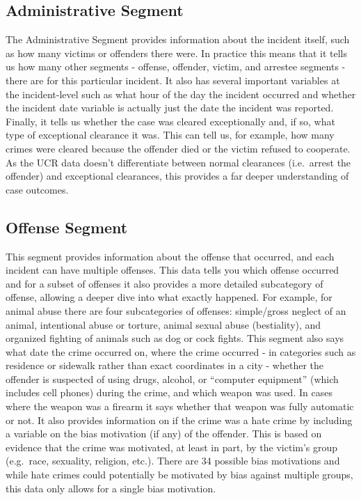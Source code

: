 \documentclass[
]{krantz}
\begin{document}
\subsection{Administrative
Segment}\label{administrative-segment}

The Administrative Segment provides information about the
incident itself, such as how many victims or offenders there
were. In practice this means that it tells us how many other
segments - offense, offender, victim, and arrestee segments
- there are for this particular incident. It also has
several important variables at the incident-level such as
what hour of the day the incident occurred and whether the
incident date variable is actually just the date the
incident was reported. Finally, it tells us whether the case
was cleared exceptionally and, if so, what type of
exceptional clearance it was. This can tell us, for example,
how many crimes were cleared because the offender died or
the victim refused to cooperate. As the UCR data doesn't
differentiate between normal clearances (i.e.~arrest the
offender) and exceptional clearances, this provides a far
deeper understanding of case outcomes.

\subsection{Offense Segment}\label{offense-segment}

This segment provides information about the offense that
occurred, and each incident can have multiple offenses. This
data tells you which offense occurred and for a subset of
offenses it also provides a more detailed subcategory of
offense, allowing a deeper dive into what exactly happened.
For example, for animal abuse there are four subcategories
of offenses: simple/gross neglect of an animal, intentional
abuse or torture, animal sexual abuse (bestiality), and
organized fighting of animals such as dog or cock fights.
This segment also says what date the crime occurred on,
where the crime occurred - in categories such as residence
or sidewalk rather than exact coordinates in a city -
whether the offender is suspected of using drugs, alcohol,
or ``computer equipment'' (which includes cell phones)
during the crime, and which weapon was used. In cases where
the weapon was a firearm it says whether that weapon was
fully automatic or not. It also provides information on if
the crime was a hate crime by including a variable on the
bias motivation (if any) of the offender. This is based on
evidence that the crime was motivated, at least in part, by
the victim's group (e.g.~race, sexuality, religion, etc.).
There are 34 possible bias motivations and while hate crimes
could potentially be motivated by bias against multiple
groups, this data only allows for a single bias motivation.
\end{document}
